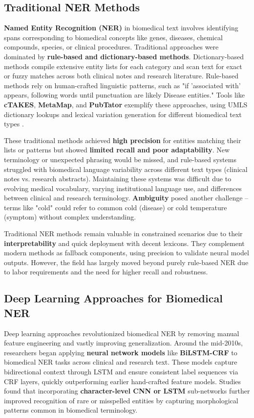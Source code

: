 \subsection{Traditional NER Methods}

\textbf{Named Entity Recognition (NER)} in biomedical text involves identifying spans corresponding to biomedical concepts like genes, diseases, chemical compounds, species, or clinical procedures. Traditional approaches were dominated by \textbf{rule-based and dictionary-based methods}. Dictionary-based methods compile extensive entity lists for each category and scan text for exact or fuzzy matches across both clinical notes and research literature. Rule-based methods rely on human-crafted linguistic patterns, such as "if 'associated with' appears, following words until punctuation are likely Disease entities." Tools like \textbf{cTAKES}, \textbf{MetaMap}, and \textbf{PubTator} exemplify these approaches, using UMLS dictionary lookups and lexical variation generation for different biomedical text types \parencite{Stenetorp2024}.

These traditional methods achieved \textbf{high precision} for entities matching their lists or patterns but showed \textbf{limited recall and poor adaptability}. New terminology or unexpected phrasing would be missed, and rule-based systems struggled with biomedical language variability across different text types (clinical notes vs. research abstracts). Maintaining these systems was difficult due to evolving medical vocabulary, varying institutional language use, and differences between clinical and research terminology. \textbf{Ambiguity} posed another challenge – terms like "cold" could refer to common cold (disease) or cold temperature (symptom) without complex understanding.

Traditional NER methods remain valuable in constrained scenarios due to their \textbf{interpretability} and quick deployment with decent lexicons. They complement modern methods as fallback components, using precision to validate neural model outputs. However, the field has largely moved beyond purely rule-based NER due to labor requirements and the need for higher recall and robustness.

\subsection{Deep Learning Approaches for Biomedical NER}

Deep learning approaches revolutionized biomedical NER by removing manual feature engineering and vastly improving generalization. Around the mid-2010s, researchers began applying \textbf{neural network models} like \textbf{BiLSTM-CRF} to biomedical NER tasks across clinical and research text. These models capture bidirectional context through LSTM and ensure consistent label sequences via CRF layers, quickly outperforming earlier hand-crafted feature models. Studies found that incorporating \textbf{character-level CNN or LSTM} sub-networks further improved recognition of rare or misspelled entities by capturing morphological patterns common in biomedical terminology.


